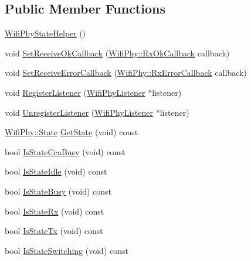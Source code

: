 \subsection*{Public Member Functions}
\begin{DoxyCompactItemize}
\item 
\hyperlink{classns3_1_1WifiPhyStateHelper_a349813aadfc35ffdfb50860a276b6ad8}{Wifi\+Phy\+State\+Helper} ()
\item 
void \hyperlink{classns3_1_1WifiPhyStateHelper_a222e53adaae601252dcff2752f3b6a13}{Set\+Receive\+Ok\+Callback} (\hyperlink{classns3_1_1WifiPhy_a8fc4f4e9b9bd7ef70dd8b050ae2e3188}{Wifi\+Phy\+::\+Rx\+Ok\+Callback} callback)
\item 
void \hyperlink{classns3_1_1WifiPhyStateHelper_a03537a4fa941b8bdb91682b1269f2707}{Set\+Receive\+Error\+Callback} (\hyperlink{classns3_1_1WifiPhy_af6e035a7c603eec7eae9b9365b13742e}{Wifi\+Phy\+::\+Rx\+Error\+Callback} callback)
\item 
void \hyperlink{classns3_1_1WifiPhyStateHelper_a82d28fc111e04ebf8ea313b7b44b5b5d}{Register\+Listener} (\hyperlink{classns3_1_1WifiPhyListener}{Wifi\+Phy\+Listener} $\ast$listener)
\item 
void \hyperlink{classns3_1_1WifiPhyStateHelper_aec50bcf45cf8341855bf2f68e92df565}{Unregister\+Listener} (\hyperlink{classns3_1_1WifiPhyListener}{Wifi\+Phy\+Listener} $\ast$listener)
\item 
\hyperlink{classns3_1_1WifiPhy_af97408fa76f99797497b492758467143}{Wifi\+Phy\+::\+State} \hyperlink{classns3_1_1WifiPhyStateHelper_a6f8462bb1ac5ee6873860ac8b7e694fa}{Get\+State} (void) const 
\item 
bool \hyperlink{classns3_1_1WifiPhyStateHelper_a2389e7fcd316f5a62ca0702062d6cede}{Is\+State\+Cca\+Busy} (void) const 
\item 
bool \hyperlink{classns3_1_1WifiPhyStateHelper_ab32e1ddb34ae4a0694a17ccd968577d0}{Is\+State\+Idle} (void) const 
\item 
bool \hyperlink{classns3_1_1WifiPhyStateHelper_a7746815d9f93655cbf9574410a2b1fbc}{Is\+State\+Busy} (void) const 
\item 
bool \hyperlink{classns3_1_1WifiPhyStateHelper_a3a657fca59415d0342ea7b1e9ec9d626}{Is\+State\+Rx} (void) const 
\item 
bool \hyperlink{classns3_1_1WifiPhyStateHelper_a182ae8e37bd9a3cf60731c34a2ac8153}{Is\+State\+Tx} (void) const 
\item 
bool \hyperlink{classns3_1_1WifiPhyStateHelper_aa7b770c164848551da55b985663c2ed4}{Is\+State\+Switching} (void) const 

\end{DoxyCompactItemize}
